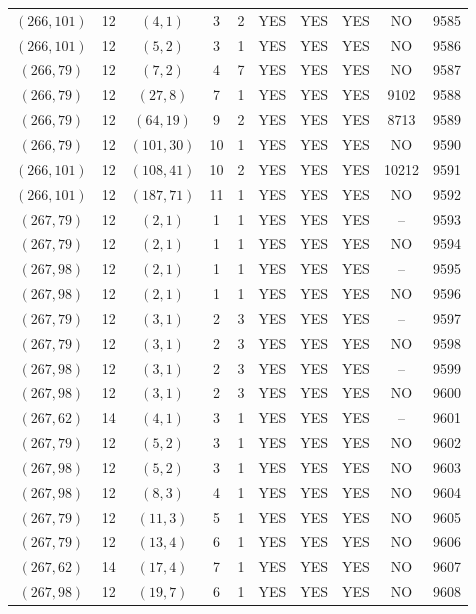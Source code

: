 \begin{longtable}{|c|c|c|c|c|c|c|c|c|c|}
$(266, 101)$ & 12 & $(4, 1)$ & 3 & 2 & YES & YES & YES & NO & 9585\\
$(266, 101)$ & 12 & $(5, 2)$ & 3 & 1 & YES & YES & YES & NO & 9586\\
$(266, 79)$ & 12 & $(7, 2)$ & 4 & 7 & YES & YES & YES & NO & 9587\\
$(266, 79)$ & 12 & $(27, 8)$ & 7 & 1 & YES & YES & YES & 9102 & 9588\\
$(266, 79)$ & 12 & $(64, 19)$ & 9 & 2 & YES & YES & YES & 8713 & 9589\\
$(266, 79)$ & 12 & $(101, 30)$ & 10 & 1 & YES & YES & YES & NO & 9590\\
$(266, 101)$ & 12 & $(108, 41)$ & 10 & 2 & YES & YES & YES & 10212 & 9591\\
$(266, 101)$ & 12 & $(187, 71)$ & 11 & 1 & YES & YES & YES & NO & 9592\\
$(267, 79)$ & 12 & $(2, 1)$ & 1 & 1 & YES & YES & YES & -- & 9593\\
$(267, 79)$ & 12 & $(2, 1)$ & 1 & 1 & YES & YES & YES & NO & 9594\\
$(267, 98)$ & 12 & $(2, 1)$ & 1 & 1 & YES & YES & YES & -- & 9595\\
$(267, 98)$ & 12 & $(2, 1)$ & 1 & 1 & YES & YES & YES & NO & 9596\\
$(267, 79)$ & 12 & $(3, 1)$ & 2 & 3 & YES & YES & YES & -- & 9597\\
$(267, 79)$ & 12 & $(3, 1)$ & 2 & 3 & YES & YES & YES & NO & 9598\\
$(267, 98)$ & 12 & $(3, 1)$ & 2 & 3 & YES & YES & YES & -- & 9599\\
$(267, 98)$ & 12 & $(3, 1)$ & 2 & 3 & YES & YES & YES & NO & 9600\\
$(267, 62)$ & 14 & $(4, 1)$ & 3 & 1 & YES & YES & YES & -- & 9601\\
$(267, 79)$ & 12 & $(5, 2)$ & 3 & 1 & YES & YES & YES & NO & 9602\\
$(267, 98)$ & 12 & $(5, 2)$ & 3 & 1 & YES & YES & YES & NO & 9603\\
$(267, 98)$ & 12 & $(8, 3)$ & 4 & 1 & YES & YES & YES & NO & 9604\\
$(267, 79)$ & 12 & $(11, 3)$ & 5 & 1 & YES & YES & YES & NO & 9605\\
$(267, 79)$ & 12 & $(13, 4)$ & 6 & 1 & YES & YES & YES & NO & 9606\\
$(267, 62)$ & 14 & $(17, 4)$ & 7 & 1 & YES & YES & YES & NO & 9607\\
$(267, 98)$ & 12 & $(19, 7)$ & 6 & 1 & YES & YES & YES & NO & 9608\\

\end{longtable}
